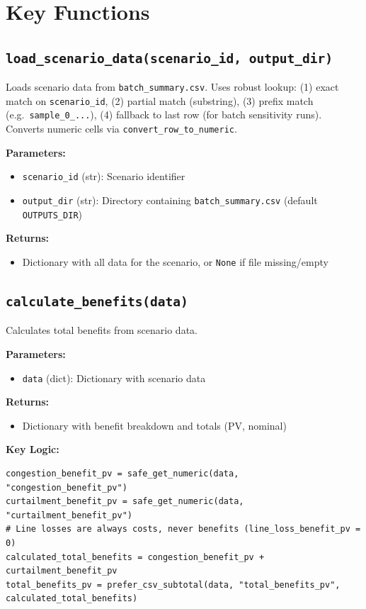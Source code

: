 \documentclass[ctcc_full_documentation.tex]{subfiles}
\begin{document}
\section{Key Functions}

\subsection{\texttt{load\_scenario\_data(scenario\_id, output\_dir)}}

Loads scenario data from \texttt{batch\_summary.csv}. Uses robust lookup: (1) exact match on \texttt{scenario\_id}, (2) partial match (substring), (3) prefix match (e.g.\ \texttt{sample\_0\_...}), (4) fallback to last row (for batch sensitivity runs). Converts numeric cells via \texttt{convert\_row\_to\_numeric}.

\textbf{Parameters:}
\begin{itemize}
    \item \texttt{scenario\_id} (str): Scenario identifier
    \item \texttt{output\_dir} (str): Directory containing \texttt{batch\_summary.csv} (default \texttt{OUTPUTS\_DIR})
\end{itemize}

\textbf{Returns:}
\begin{itemize}
    \item Dictionary with all data for the scenario, or \texttt{None} if file missing/empty
\end{itemize}

\subsection{\texttt{calculate\_benefits(data)}}

Calculates total benefits from scenario data.

\textbf{Parameters:}
\begin{itemize}
    \item \texttt{data} (dict): Dictionary with scenario data
\end{itemize}

\textbf{Returns:}
\begin{itemize}
    \item Dictionary with benefit breakdown and totals (PV, nominal)
\end{itemize}

\textbf{Key Logic:}
\begin{lstlisting}
congestion_benefit_pv = safe_get_numeric(data, "congestion_benefit_pv")
curtailment_benefit_pv = safe_get_numeric(data, "curtailment_benefit_pv")
# Line losses are always costs, never benefits (line_loss_benefit_pv = 0)
calculated_total_benefits = congestion_benefit_pv + curtailment_benefit_pv
total_benefits_pv = prefer_csv_subtotal(data, "total_benefits_pv", calculated_total_benefits)
\end{lstlisting}
\end{document}

